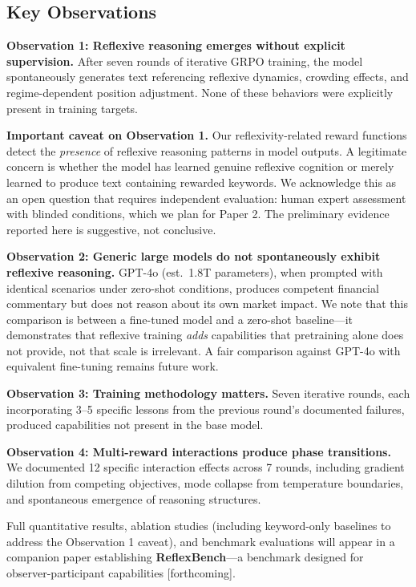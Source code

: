\documentclass[11pt,a4paper]{article}
\begin{document}
\subsection{Key Observations}

\textbf{Observation 1: Reflexive reasoning emerges without explicit supervision.} After seven rounds of iterative GRPO training, the model spontaneously generates text referencing reflexive dynamics, crowding effects, and regime-dependent position adjustment. None of these behaviors were explicitly present in training targets.

\textbf{Important caveat on Observation 1.} Our reflexivity-related reward functions detect the \textit{presence} of reflexive reasoning patterns in model outputs. A legitimate concern is whether the model has learned genuine reflexive cognition or merely learned to produce text containing rewarded keywords. We acknowledge this as an open question that requires independent evaluation: human expert assessment with blinded conditions, which we plan for Paper 2. The preliminary evidence reported here is suggestive, not conclusive.

\textbf{Observation 2: Generic large models do not spontaneously exhibit reflexive reasoning.} GPT-4o (est.\ 1.8T parameters), when prompted with identical scenarios under zero-shot conditions, produces competent financial commentary but does not reason about its own market impact. We note that this comparison is between a fine-tuned model and a zero-shot baseline---it demonstrates that reflexive training \textit{adds} capabilities that pretraining alone does not provide, not that scale is irrelevant. A fair comparison against GPT-4o with equivalent fine-tuning remains future work.

\textbf{Observation 3: Training methodology matters.} Seven iterative rounds, each incorporating 3--5 specific lessons from the previous round's documented failures, produced capabilities not present in the base model.

\textbf{Observation 4: Multi-reward interactions produce phase transitions.} We documented 12 specific interaction effects across 7 rounds, including gradient dilution from competing objectives, mode collapse from temperature boundaries, and spontaneous emergence of reasoning structures.

Full quantitative results, ablation studies (including keyword-only baselines to address the Observation 1 caveat), and benchmark evaluations will appear in a companion paper establishing \textbf{ReflexBench}---a benchmark designed for observer-participant capabilities [forthcoming].
\end{document}

